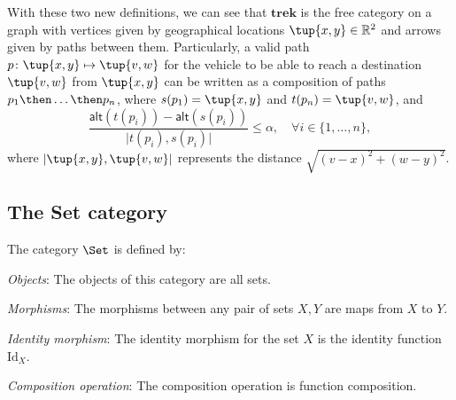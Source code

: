 With these two new definitions, we can see that $\mathbf{trek}$ is the free category on a graph with vertices given by geographical locations $\tup{x,y}\in \mathbb{R}^2$ and arrows given by paths between them. Particularly, a valid path $p\colon \tup{x,y}\mapsto \tup{v,w}$ for the vehicle to be able to reach a destination $\tup{v,w}$ from $\tup{x,y}$ can be written as a composition of paths $p_1\then \ldots \then p_n$, where $s(p_1)=\tup{x,y}$ and $t(p_n)=\tup{v,w}$, and
\begin{equation}
    \frac{\mathsf{alt}(t(p_i))-\mathsf{alt}(s(p_i))}{\vert t(p_i), s(p_i)\vert}\leq \alpha, \quad \forall i\in \{1,\ldots, n\},
\end{equation}
where $\vert \tup{x,y},\tup{v,w}\vert$ represents the distance $\sqrt{(v-x)^2+(w-y)^2}$.



\subsection{The Set category}


\begin{shaded}
\begin{definition}
    The category $\Set$ is defined by:
    \begin{compactenum}
    \item \emph{Objects}: The objects of this category are all sets.
    \item \emph{Morphisms}: The morphisms between any pair of sets $X, Y$
    are maps from $X$ to $Y$.
    \item \emph{Identity morphism}: The identity morphism for the set $X$
    is the identity function $\text{Id}_X$.
    \item \emph{Composition operation}: The composition operation is function
    composition.
    \end{compactenum}
\end{definition}
\end{shaded}

